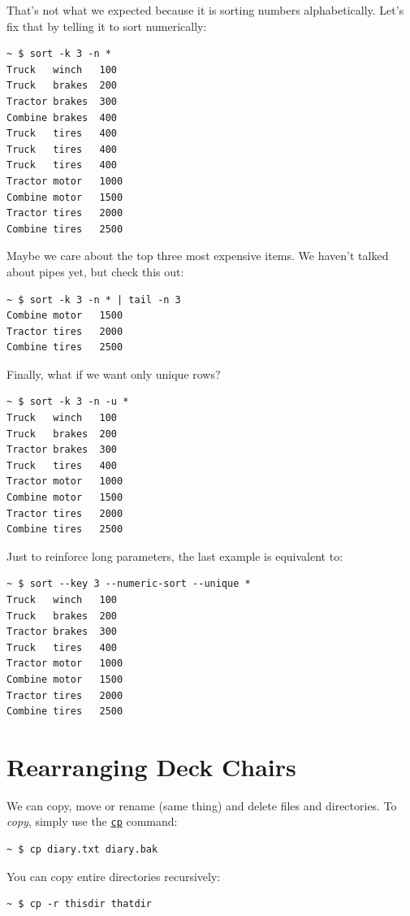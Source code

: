 \documentclass[10pt,]{book}
\numberwithin{figure}{chapter}
\begin{document}
That's not what we expected because it is sorting numbers
alphabetically. Let's fix that by telling it to sort numerically:

\begin{verbatim}
~ $ sort -k 3 -n *
Truck   winch   100
Truck   brakes  200
Tractor brakes  300
Combine brakes  400
Truck   tires   400
Truck   tires   400
Truck   tires   400
Tractor motor   1000
Combine motor   1500
Tractor tires   2000
Combine tires   2500
\end{verbatim}

Maybe we care about the top three most expensive items. We haven't
talked about pipes yet, but check this out:

\begin{verbatim}
~ $ sort -k 3 -n * | tail -n 3
Combine motor   1500
Tractor tires   2000
Combine tires   2500
\end{verbatim}

Finally, what if we want only unique rows?

\begin{verbatim}
~ $ sort -k 3 -n -u *
Truck   winch   100
Truck   brakes  200
Tractor brakes  300
Truck   tires   400
Tractor motor   1000
Combine motor   1500
Tractor tires   2000
Combine tires   2500
\end{verbatim}

Just to reinforce long parameters, the last example is equivalent to:

\begin{verbatim}
~ $ sort --key 3 --numeric-sort --unique *
Truck   winch   100
Truck   brakes  200
Tractor brakes  300
Truck   tires   400
Tractor motor   1000
Combine motor   1500
Tractor tires   2000
Combine tires   2500
\end{verbatim}

\section{Rearranging Deck Chairs}\label{rearranging-deck-chairs}

We can copy, move or rename (same thing) and delete files and
directories. To \emph{copy}, simply use the
\href{http://linux.die.net/man/1/cp}{\texttt{cp}} command:

\begin{verbatim}
~ $ cp diary.txt diary.bak
\end{verbatim}

You can copy entire directories recursively:

\begin{verbatim}
~ $ cp -r thisdir thatdir
\end{verbatim}
\end{document}
